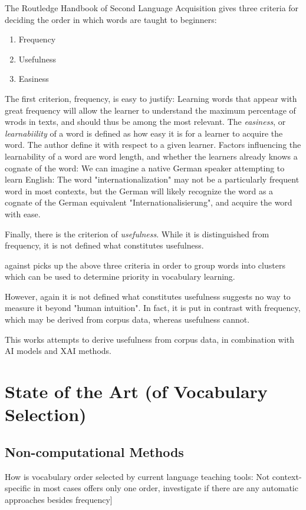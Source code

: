 The Routledge Handbook of Second Language Acquisition  gives three criteria for deciding the order in which words are taught to beginners:
\begin{enumerate}
	\item Frequency
	\item Usefulness
	\item Easiness
\end{enumerate}
The first criterion, frequency, is easy to justify:
Learning words that appear with great frequency will allow the learner to understand the maximum percentage of wrods in texts, and should thus be among the most relevant.
The \textit{easiness}, or \textit{learnabiility} of a word is defined as how easy it is for a learner to acquire the word.
The author define it with respect to a given learner.
Factors influencing the learnability of a word are word length, and whether the learners already knows a cognate of the word:
We can imagine a native German speaker attempting to learn English:
The word "internationalization" may not be a particularly frequent word in most contexts, but the German will likely recognize the word as a cognate of the German equivalent "Internationalisierung", and acquire the word with ease.

Finally, there is the criterion of \textit{usefulness}.
While it is distinguished from frequency, it is not defined what constitutes usefulness.

 against picks up the above three criteria in order to group words into clusters which can be used to determine priority in vocabulary learning.

However, again it is not defined what constitutes usefulness suggests no way to measure it beyond "human intuition".
In fact, it is put in contrast with frequency, which may be derived from corpus data, whereas usefulness cannot.

This works attempts to derive usefulness from corpus data, in combination with AI models and XAI methods.



\section{State of the Art (of Vocabulary Selection)} \label{seq:state-of-the-art-vocabulary-selection}
\subsection{Non-computational Methods}
How is vocabulary order selected by current language teaching tools:
Not context-specific in most cases
offers only one order,
investigate if there are any automatic approaches besides frequency]

